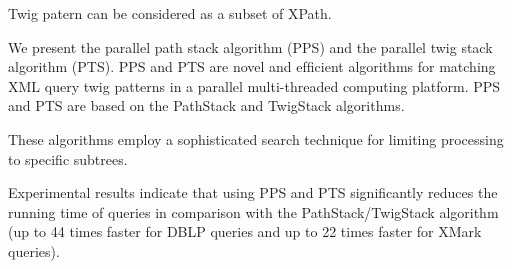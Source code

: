 \documentclass{paper}
\begin{document}
Twig patern can be considered as a subset of XPath.

We present the parallel path stack algorithm (PPS) and the parallel twig stack
algorithm (PTS). PPS and PTS are novel and efﬁcient algorithms for matching XML
query twig patterns in a parallel multi-threaded computing platform. PPS and PTS
are based on the PathStack and TwigStack algorithms. 

These algorithms employ a sophisticated search technique for limiting processing
to speciﬁc subtrees. 

Experimental results indicate that using PPS and PTS signiﬁcantly reduces the
running time of queries in comparison with the PathStack/TwigStack algorithm (up
to 44 times faster for DBLP queries and up to 22 times faster for XMark
queries).
\end{document}
